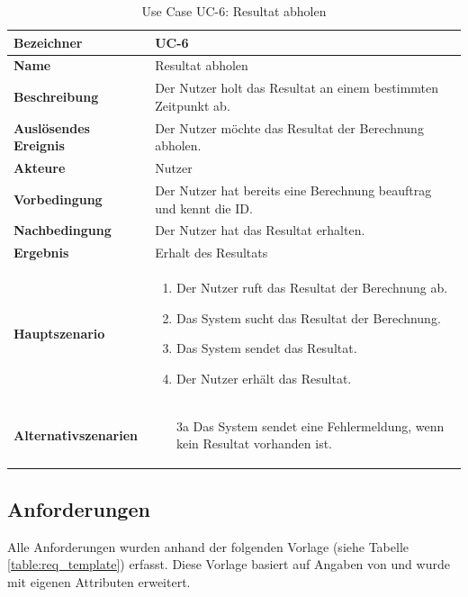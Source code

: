 \begin{table}[ht]
\centering
  \begin{tabular}{ l | p{10cm} }
	\hline
	\rowcolor{gray}
	\textbf{Bezeichner}	&	\textbf{UC-6}\\ \hline
	\textbf{Name}			&	Resultat abholen\\ \hline
	\textbf{Beschreibung}	&	Der Nutzer holt das Resultat an einem bestimmten Zeitpunkt ab.\\ \hline
	\textbf{Auslösendes Ereignis}&	Der Nutzer möchte das Resultat der Berechnung abholen.\\ \hline
	\textbf{Akteure}		&	Nutzer\\ \hline
	\textbf{Vorbedingung}	&	Der Nutzer hat bereits eine Berechnung beauftrag und kennt die ID.\\ \hline
	\textbf{Nachbedingung}	&	Der Nutzer hat das Resultat erhalten.\\ \hline
	\textbf{Ergebnis}		&	Erhalt des Resultats\\ \hline
	\textbf{Hauptszenario}	&	\begin{enumerate}
					\item Der Nutzer ruft das Resultat der Berechnung ab.
					\item Das System sucht das Resultat der Berechnung.
					\item Das System sendet das Resultat.
					\item Der Nutzer erhält das Resultat.
					\end{enumerate}
					\\ \hline
	\textbf{Alternativszenarien}	&	\begin{enumerate}
					\item[3a] Das System sendet eine Fehlermeldung, wenn kein Resultat vorhanden ist.
					\end{enumerate}
					\\ \hline
  \end{tabular}
   \caption{Use Case UC-6: Resultat abholen}\label{table:use_case_6}
\end{table}

\newpage
\FloatBarrier
\subsection{Anforderungen}\label{anforderungen}
Alle Anforderungen wurden anhand der folgenden Vorlage (siehe Tabelle \ref{table:req_template}) erfasst. Diese Vorlage basiert auf Angaben von \cite{req_eng_book} und wurde mit 
eigenen Attributen erweitert.


